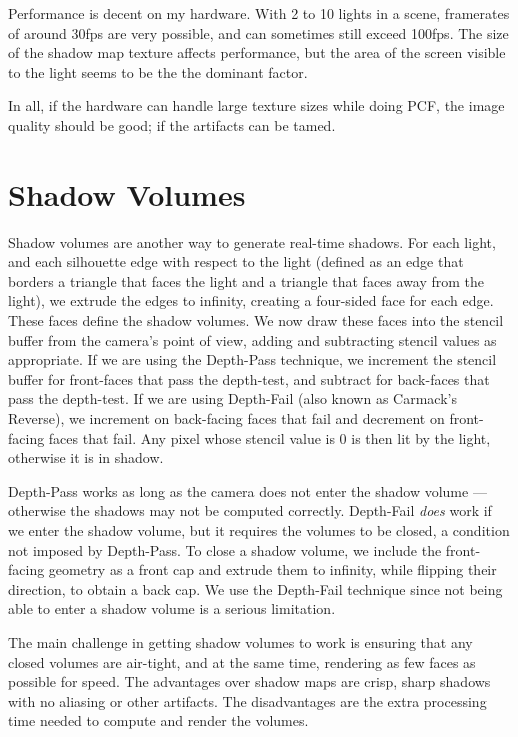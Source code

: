 \documentclass{llncs}
\begin{document}
\begin{multicols}{2}
{Performance is decent on my hardware.  With 2 to 10 lights in a scene, framerates of around
30fps are very possible, and can sometimes still exceed 100fps.  The size of the shadow
map texture affects performance, but the area of the screen visible to the light
seems to be the the dominant factor.   

In all, if the hardware can handle large texture sizes while doing PCF, the image
quality should be good; if the artifacts can be tamed. 

\section{Shadow Volumes}  
Shadow volumes are another way to generate real-time shadows.  For each light, and
each silhouette edge with respect to the light (defined as an edge that borders a triangle 
that faces the light and a triangle that faces away from the light), we extrude the edges to 
infinity, creating a four-sided face for each edge.  These faces define the shadow volumes.
We now draw these faces into the stencil buffer from the camera's point of view, adding
and subtracting stencil values as appropriate.  If we are using the Depth-Pass technique,
we increment the stencil buffer for front-faces that pass the depth-test, and subtract for 
back-faces that pass the depth-test.  If we are using Depth-Fail (also known as Carmack's 
Reverse), we increment on back-facing faces that fail and decrement on front-facing
faces that fail.  Any pixel whose stencil value is 0 is then lit by the light, otherwise
it is in shadow. 

Depth-Pass works as long as the camera does not enter the shadow volume --- otherwise
the shadows may not be computed correctly.  Depth-Fail \textit{does} work if we enter
the shadow volume, but it requires the volumes to be closed, a condition
not imposed by Depth-Pass.  To close a shadow volume, we include the front-facing
geometry as a front cap and extrude them to infinity, while flipping their
direction, to obtain a back cap.  We use the Depth-Fail technique since not being able
to enter a shadow volume is a serious limitation. 

The main challenge in getting shadow volumes to work is ensuring that any closed volumes
are air-tight, and at the same time, rendering as few faces as possible for speed. 
The advantages over shadow maps are crisp, sharp shadows with no aliasing or other artifacts.  
The disadvantages are the extra processing time needed to compute and render the volumes.

}
\end{multicols}
\end{document}
